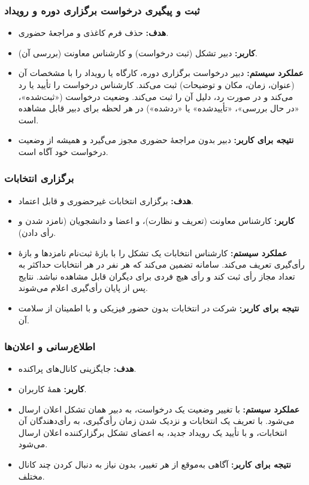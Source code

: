 \documentclass[a4paper,12pt]{article}
\begin{document}
\subsubsection{ثبت و پیگیری درخواست برگزاری دوره و رویداد}
\begin{itemize}
	\item \textbf{هدف:} حذف فرم کاغذی و مراجعهٔ حضوری.
	\item \textbf{کاربر:} دبیر تشکل (ثبت درخواست) و کارشناس معاونت (بررسی آن).
	\item \textbf{عملکرد سیستم:} دبیر درخواست برگزاری دوره، کارگاه یا رویداد را با مشخصات آن (عنوان، زمان، مکان و توضیحات) ثبت می‌کند. کارشناس درخواست را تأیید یا رد می‌کند و در صورت رد، دلیل آن را ثبت می‌کند. وضعیت درخواست («ثبت‌شده»، «در حال بررسی»، «تأییدشده» یا «ردشده») در هر لحظه برای دبیر قابل مشاهده است.
	\item \textbf{نتیجه برای کاربر:} دبیر بدون مراجعهٔ حضوری مجوز می‌گیرد و همیشه از وضعیت درخواست خود آگاه است.
\end{itemize}

\vspace*{0.5cm}
\subsubsection{برگزاری انتخابات}
\begin{itemize}
	\item \textbf{هدف:} برگزاری انتخابات غیرحضوری و قابل اعتماد.
	\item \textbf{کاربر:} کارشناس معاونت (تعریف و نظارت)، و اعضا و دانشجویان (نامزد شدن و رأی دادن).
	\item \textbf{عملکرد سیستم:}
          کارشناس انتخابات یک تشکل را با بازهٔ ثبت‌نام نامزدها و بازهٔ رأی‌گیری تعریف می‌کند. سامانه تضمین می‌کند که هر نفر در هر انتخابات حداکثر به تعداد مجاز رأی ثبت کند و رأی هیچ فردی برای دیگران قابل مشاهده نباشد. نتایج پس از پایان رأی‌گیری اعلام می‌شوند.
	\item \textbf{نتیجه برای کاربر:} شرکت در انتخابات بدون حضور فیزیکی و با اطمینان از سلامت آن.
\end{itemize}

\vspace*{0.5cm}
\subsubsection{اطلاع‌رسانی و اعلان‌ها}
\begin{itemize}
	\item \textbf{هدف:} جایگزینی کانال‌های پراکنده.
	\item \textbf{کاربر:} همهٔ کاربران.
	\item \textbf{عملکرد سیستم:} با تغییر وضعیت یک درخواست، به دبیر همان تشکل اعلان ارسال می‌شود. با تعریف یک انتخابات و نزدیک شدن زمان رأی‌گیری، به رأی‌دهندگان آن انتخابات، و با تأیید یک رویداد جدید، به اعضای تشکل برگزارکننده اعلان ارسال می‌شود.
	\item \textbf{نتیجه برای کاربر:} آگاهی به‌موقع از هر تغییر، بدون نیاز به دنبال کردن چند کانال مختلف.
\end{itemize}
\end{document}
